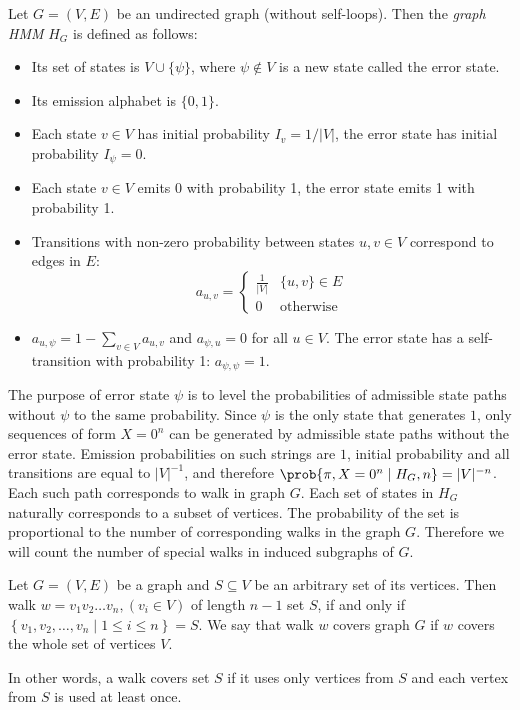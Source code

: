 \begin{definition}\label{GraphHMM}
Let $G=(V,E)$ be an undirected graph (without self-loops). 
Then the \emph{graph HMM} $H_G$ is defined as follows:
\begin{itemize}[itemsep=-1mm]
\item Its set of states is $V\cup \{\psi\}$, where $\psi\notin V$ is a
  new state called the error state.
\item Its emission alphabet is $\{0,1\}$.
\item Each state $v\in V$ has initial probability $I_{v} = 1/|V|$, the
error state has initial probability $I_{\psi}=0$.
\item Each state $v\in V$ emits 0 with probability 1, the error state emits 1 
with probability 1.
\item Transitions with non-zero probability between states $u,v\in V$
  correspond to edges in $E$:
$$a_{u,v}=\begin{cases}
\frac1{|V|} & \{u,v\}\in E\\
0 & \text{otherwise}
\end{cases}$$
\item $a_{u,\psi}=1-\sum_{v\in V}a_{u,v}$
and $a_{\psi,u}=0$ for all $u\in V$. The error state has a self-transition with
probability 1: $a_{\psi,\psi}=1$.
\end{itemize}
\end{definition}

The purpose of error state $\psi$ is to level the probabilities of admissible
state paths without $\psi$ to the same probability. Since $\psi$ is the only
state that generates $1$, only sequences of form $X=0^n$ can be generated by
admissible state paths without the error state. Emission probabilities on such
strings are $1$, initial probability and all transitions are equal to
$|V|^{-1}$, and therefore $\prob{\pi, X=0^n\mid H_G,n} = |V|^{-n}$.  Each such
path corresponds to walk in graph $G$. Each set of states in $H_G$ naturally
corresponds to a subset of vertices. The probability of the set is proportional
to the number of corresponding walks in the graph $G$. Therefore we will count
the number of special walks in induced subgraphs of $G$.

\begin{definition}
Let $G=(V, E)$ be a graph and $S\subseteq V$ be an arbitrary set of its
vertices.  Then walk $w=v_1v_2\dots v_n, (v_i\in V)$ of length $n-1$
 set $S$, if and only if $\left\{v_1, v_2, \dots, v_n\mid
1\leq i\leq n\right\}=S$.  We say that walk $w$ covers graph $G$ if $w$ covers
the whole set of vertices $V$.

\end{definition}
In other words, a walk covers set $S$ if it uses only vertices from $S$ and each
vertex from $S$ is used at least once.

